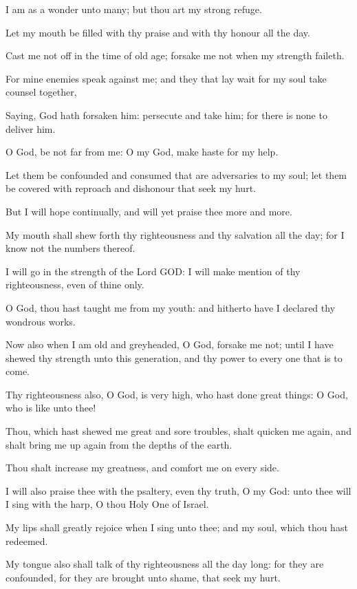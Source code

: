 \verse I am as a wonder unto many; but thou art my strong refuge.

\verse Let my mouth be filled with thy praise and with thy honour all the day.

\verse Cast me not off in the time of old age; forsake me not when my strength faileth.

\verse For mine enemies speak against me; and they that lay wait for my soul take counsel together,

\verse Saying, God hath forsaken him: persecute and take him; for there is none to deliver him.

\verse O God, be not far from me: O my God, make haste for my help.

\verse Let them be confounded and consumed that are adversaries to my soul; let them be covered with reproach and dishonour that seek my hurt.

\verse But I will hope continually, and will yet praise thee more and more.

\verse My mouth shall shew forth thy righteousness and thy salvation all the day; for I know not the numbers thereof.

\verse I will go in the strength of the Lord GOD: I will make mention of thy righteousness, even of thine only.

\verse O God, thou hast taught me from my youth: and hitherto have I declared thy wondrous works.

\verse Now also when I am old and greyheaded, O God, forsake me not; until I have shewed thy strength unto this generation, and thy power to every one that is to come.

\verse Thy righteousness also, O God, is very high, who hast done great things: O God, who is like unto thee!

\verse Thou, which hast shewed me great and sore troubles, shalt quicken me again, and shalt bring me up again from the depths of the earth.

\verse Thou shalt increase my greatness, and comfort me on every side.

\verse I will also praise thee with the psaltery, even thy truth, O my God: unto thee will I sing with the harp, O thou Holy One of Israel.

\verse My lips shall greatly rejoice when I sing unto thee; and my soul, which thou hast redeemed.

\verse My tongue also shall talk of thy righteousness all the day long: for they are confounded, for they are brought unto shame, that seek my hurt.




